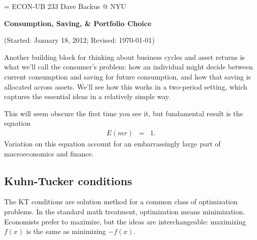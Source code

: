 \documentclass[11pt]{article}
\begin{document}
\parskip=\bigskipamount
\parindent=0.0in
\thispagestyle{empty}
{\large ECON-UB 233 \hfill Dave Backus @ NYU}

\bigskip\bigskip
\centerline{\Large \bf Consumption, Saving, \& Portfolio Choice}
\centerline{(Started: January 18, 2012; Revised: \today)}

\bigskip
Another building block for thinking about business cycles
and asset returns is what we'll call the consumer's problem:
how an individual might decide between current consumption
and saving for future consumption,
and how that saving is allocated across assets.
We'll see how this works in a two-period setting,
which captures the essential ideas in a relatively simple way.

This will seem obscure the first time you see it,
but fundamental result is the equation
\begin{eqnarray*}
    E (mr) &=& 1 .
\end{eqnarray*}
Variation on this equation account for
an embarrassingly large part of macroeconomics and finance.


\subsection*{Kuhn-Tucker conditions}

The KT conditions are solution method for a common class of optimization problems.
In the standard math treatment, optimization means minimization.
Economists prefer to maximize, but the ideas are interchangeable:
maximizing $f(x)$ is the same as minimizing $-f(x)$.
\end{document}
